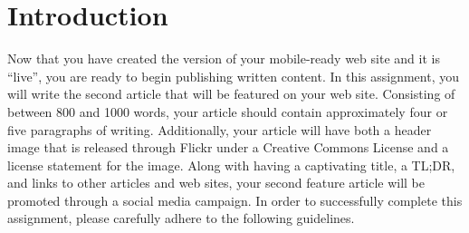 

\usepackage[compact]{titlesec}




\vspace*{-.2in}
\section*{Introduction}

Now that you have created the version of your mobile-ready web site and it is ``live'', you are ready to begin
publishing written content. In this assignment, you will write the second article that will be featured on your web
site. Consisting of between 800 and 1000 words, your article should contain approximately four or five paragraphs of
writing. Additionally, your article will have both a header image that is released through Flickr under a Creative
Commons License and a license statement for the image. Along with having a captivating title, a TL;DR, and links to
other articles and web sites, your second feature article will be promoted through a social media campaign. In order to
successfully complete this assignment, please carefully adhere to the following guidelines.

